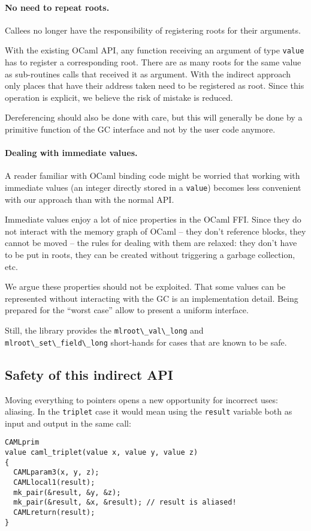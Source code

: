 \documentclass[a4paper]{easychair}
\newcommand{\cpp}[1]{\lstinline[style=C++]{#1}}
\begin{document}
\paragraph{No need to repeat roots.}

Callees no longer have the responsibility of registering roots for their arguments.

With the existing OCaml API, any function receiving an argument of type
\cpp{value} has to register a corresponding root. There are as many
roots for the same value as sub-routines calls that received it as
argument.  With the indirect approach only places that have their
address taken need to be registered as root. Since this operation is explicit, we believe the risk of mistake is reduced.

Dereferencing should also be done with care, but this will generally
be done by a primitive function of the GC interface and not by the user code anymore.

\paragraph{Dealing with immediate values.}

A reader familiar with OCaml binding code might be worried that working
with immediate values (an integer directly stored in a \cpp{value})
becomes less convenient with our approach than with the normal API.

Immediate values enjoy a lot of nice properties in the OCaml FFI. Since
they do not interact with the memory graph of OCaml -- they don't reference
blocks, they cannot be moved -- the rules for dealing with them are relaxed:
they don't have to be put in roots, they can be created without triggering a
garbage collection, etc.

We argue these properties should not be exploited. That some values can be
represented without interacting with the GC is an implementation detail. Being
prepared for the ``worst case'' allow to present a uniform interface.

Still, the library provides the \cpp{mlroot\_val\_long} and
\cpp{mlroot\_set\_field\_long} short-hands for cases that are known to be
safe.

\subsection{Safety of this indirect API}

Moving everything to pointers opens a new opportunity for incorrect
uses: aliasing. In the \cpp{triplet} case it would mean using the
\cpp{result} variable both as input and output in the same call:
%
\begin{lstlisting}[style=C++]
CAMLprim
value caml_triplet(value x, value y, value z)
{
  CAMLparam3(x, y, z);
  CAMLlocal1(result);
  mk_pair(&result, &y, &z);
  mk_pair(&result, &x, &result); // result is aliased!
  CAMLreturn(result);
}
\end{lstlisting}
\end{document}
